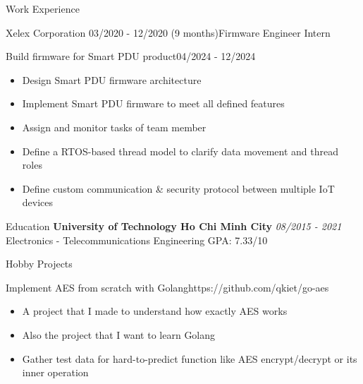 \documentclass{resume} %
\begin{document}
\begin{rSection}{Work Experience}
    \begin{rCompanySubsection} {Xelex Corporation} {03/2020 - 12/2020 (9 months)}{Firmware Engineer Intern}{}{
        \begin{rProjectSubsubsectionV2}{Build firmware for Smart PDU product}{04/2024 - 12/2024}{
            \begin{itemize}
                \item Design Smart PDU firmware architecture
                \item Implement Smart PDU firmware to meet all defined features
                \item Assign and monitor tasks of team member
            \end{itemize}
        }{
            \begin{itemize}
                \item Define a RTOS-based thread model to clarify data movement and thread roles
                \item Define custom communication \& security protocol between multiple IoT devices
            \end{itemize}
        }
        \end{rProjectSubsubsectionV2}
    }
    \end{rCompanySubsection}
\end{rSection}
\begin{rSection}{Education}
{\bf University of Technology Ho Chi Minh City} \hfill {\em 08/2015 - 2021}
\\ Electronics - Telecommunications Engineering\hfill { GPA: 7.33/10 }
\end{rSection}


\begin{rSection}{Hobby Projects}
    \begin{rHobbyProjectSubsection}{Implement AES from scratch with Golang}{https://github.com/qkiet/go-aes}{
        \begin{itemize}
            \item A project that I made to understand how exactly AES works
            \item Also the project that I want to learn Golang
        \end{itemize}
    } {
        \begin{itemize}
            \item Gather test data for hard-to-predict function like AES encrypt/decrypt or its inner operation
        \end{itemize}
    }
    \end{rHobbyProjectSubsection}
\end{rSection}
\end{document}
